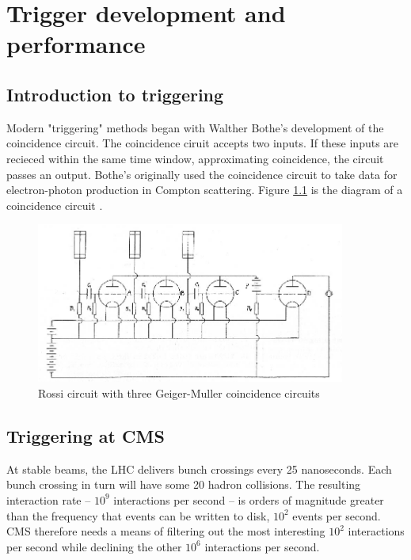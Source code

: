 
\chapter{Trigger development and performance}

\section{Introduction to triggering}

Modern "triggering" methods began with Walther Bothe's development of the coincidence circuit. The coincidence ciruit accepts two inputs. If these inputs are recieced within the same time window, approximating coincidence, the circuit passes an output. Bothe's originally used the coincidence circuit to take data for electron-photon production in Compton scattering. Figure \ref{fig:ross} is the diagram of a coincidence circuit \cite{Bonolis:2011ph}. 
\begin{figure}[h!]
\begin{centering}
\includegraphics[width=4in]{Chapter5/importfigs/Rossis-coincidence-circuit-appearing-in-Ref-65-The-selecting-resistance-on-the-right.png}
\par\end{centering}
\caption{Rossi circuit with three Geiger-Muller coincidence circuits \cite{Bonolis:2011ph} \label{fig:ross}}
\end{figure}

\section{Triggering at CMS}

At stable beams, the LHC delivers bunch crossings every 25 nanoseconds. Each bunch crossing in turn will have some 20 hadron collisions. The resulting interaction rate -- $10^9$ interactions per second -- is orders of magnitude greater than the frequency that events can be written to disk, $10^2$ events per second. CMS therefore needs a means of filtering out the most interesting $10^2$ interactions per second while declining the other $10^6$ interactions per second. 


